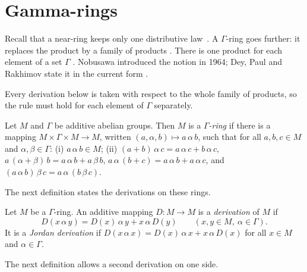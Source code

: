 \section{Gamma-rings}\label{sec:other-systems:gamma-rings}

Recall that a near-ring keeps only one distributive law~\cite[p.~2]{DeyPaulRakhimov2012}.
A $\Gamma$-ring goes further: it replaces the product by a family of
products \cite[p.~2]{DeyPaulRakhimov2012}. There is one product for each
element of a set $\Gamma$ \cite[p.~2]{DeyPaulRakhimov2012}. Nobusawa
introduced the
notion in 1964; Dey, Paul and Rakhimov state it in the current form
\cite[p.~2]{DeyPaulRakhimov2012}.

Every derivation below is taken with respect to the whole family of products,
so the rule must hold for each element of $\Gamma$ separately. %

\begin{definition}\label{def:other:gamma-ring}
Let $M$ and $\Gamma$ be additive abelian groups. Then $M$ is a
\emph{$\Gamma$-ring} if there is a mapping
$M \times \Gamma \times M \to M$, written $(a, \alpha, b) \mapsto a\,\alpha\,b$,
such that for all $a, b, c \in M$ and $\alpha, \beta \in \Gamma$:
\textup{(i)} $a\,\alpha\,b \in M$; \textup{(ii)}
$(a+b)\,\alpha\,c = a\,\alpha\,c + b\,\alpha\,c$,
$a\,(\alpha+\beta)\,b = a\,\alpha\,b + a\,\beta\,b$,
$a\,\alpha\,(b+c) = a\,\alpha\,b + a\,\alpha\,c$, and
$(a\,\alpha\,b)\,\beta\,c = a\,\alpha\,(b\,\beta\,c)$.
\end{definition}

The next definition states the derivations on these rings.

\begin{definition}\label{def:other:gamma-derivation}
Let $M$ be a $\Gamma$-ring. An additive mapping $D \colon M \to M$ is a
\emph{derivation} of $M$ if
\[
D(x\,\alpha\,y) = D(x)\,\alpha\,y + x\,\alpha\,D(y)
\qquad (x, y \in M,\ \alpha \in \Gamma).
\]
It is a \emph{Jordan derivation} if
$D(x\,\alpha\,x) = D(x)\,\alpha\,x + x\,\alpha\,D(x)$ for all $x \in M$
and $\alpha \in \Gamma$.
\end{definition}

The next definition allows a second derivation on one side.

